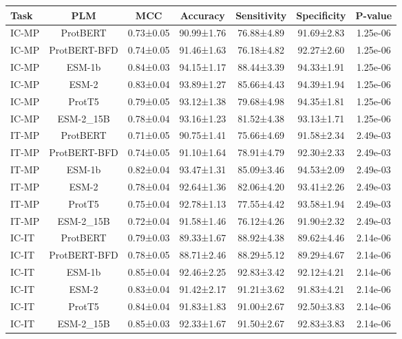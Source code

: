 \begin{tabular}{lcccccc}
\toprule
 Task &          PLM &       MCC &   Accuracy & Sensitivity & Specificity &  P-value \\
\midrule
IC-MP &     ProtBERT & 0.73±0.05 & 90.99±1.76 &  76.88±4.89 &  91.69±2.83 & 1.25e-06 \\
IC-MP & ProtBERT-BFD & 0.74±0.05 & 91.46±1.63 &  76.18±4.82 &  92.27±2.60 & 1.25e-06 \\
IC-MP &       ESM-1b & 0.84±0.03 & 94.15±1.17 &  88.44±3.39 &  94.33±1.91 & 1.25e-06 \\
IC-MP &        ESM-2 & 0.83±0.04 & 93.89±1.27 &  85.66±4.43 &  94.39±1.94 & 1.25e-06 \\
IC-MP &       ProtT5 & 0.79±0.05 & 93.12±1.38 &  79.68±4.98 &  94.35±1.81 & 1.25e-06 \\
IC-MP &    ESM-2_15B & 0.78±0.04 & 93.16±1.23 &  81.52±4.38 &  93.13±1.71 & 1.25e-06 \\
IT-MP &     ProtBERT & 0.71±0.05 & 90.75±1.41 &  75.66±4.69 &  91.58±2.34 & 2.49e-03 \\
IT-MP & ProtBERT-BFD & 0.74±0.05 & 91.10±1.64 &  78.91±4.79 &  92.30±2.33 & 2.49e-03 \\
IT-MP &       ESM-1b & 0.82±0.04 & 93.47±1.31 &  85.09±3.46 &  94.53±2.09 & 2.49e-03 \\
IT-MP &        ESM-2 & 0.78±0.04 & 92.64±1.36 &  82.06±4.20 &  93.41±2.26 & 2.49e-03 \\
IT-MP &       ProtT5 & 0.75±0.04 & 92.78±1.13 &  77.55±4.42 &  93.58±1.94 & 2.49e-03 \\
IT-MP &    ESM-2_15B & 0.72±0.04 & 91.58±1.46 &  76.12±4.26 &  91.90±2.32 & 2.49e-03 \\
IC-IT &     ProtBERT & 0.79±0.03 & 89.33±1.67 &  88.92±4.38 &  89.62±4.46 & 2.14e-06 \\
IC-IT & ProtBERT-BFD & 0.78±0.05 & 88.71±2.46 &  88.29±5.12 &  89.29±4.67 & 2.14e-06 \\
IC-IT &       ESM-1b & 0.85±0.04 & 92.46±2.25 &  92.83±3.42 &  92.12±4.21 & 2.14e-06 \\
IC-IT &        ESM-2 & 0.83±0.04 & 91.42±2.17 &  91.21±3.62 &  91.83±4.21 & 2.14e-06 \\
IC-IT &       ProtT5 & 0.84±0.04 & 91.83±1.83 &  91.00±2.67 &  92.50±3.83 & 2.14e-06 \\
IC-IT &    ESM-2_15B & 0.85±0.03 & 92.33±1.67 &  91.50±2.67 &  92.83±3.83 & 2.14e-06 \\
\bottomrule
\end{tabular}
